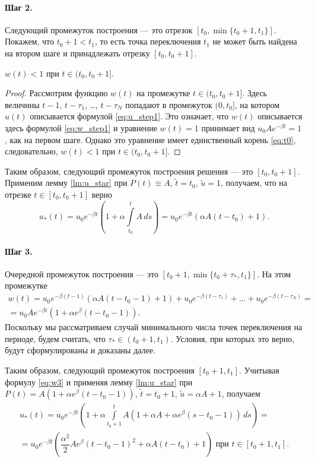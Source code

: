 \paragraph{Шаг 2.} Следующий промежуток построения --- это отрезок  $[t_0, \min\{t_0 + 1, t_1\}]$.
Покажем, что $t_0+1 < t_1$, то есть точка переключения $t_1$ не может быть найдена на втором шаге и принадлежать отрезку $[t_0, t_0 + 1]$.
\begin{lemma}
	\label{lm:u_step2}
	$w(t)<1$ при $t \in (t_0, t_0 + 1]$.
\end{lemma}
\begin{proof}
	Рассмотрим функцию $w(t)$ на промежутке $t \in (t_0,t_0+1]$. Здесь величины $t - 1$, $t - \tau_1$, \dots, $t - \tau_N$ попадают в промежуток $(0, t_0]$, на котором $u(t)$ описывается формулой \eqref{eq:u_step1}. Это означает, что $w(t)$ описывается здесь формулой \eqref{eq:w_step1} и уравнение $w(t) = 1$ принимает вид $u_0 A e^{-\beta t} = 1$, как на первом шаге. Однако это  уравнение имеет единственный корень \eqref{eq:t0}, следовательно, $w(t) < 1$ при $t \in (t_0, t_0 + 1]$.
\end{proof}

Таким образом, следующий промежуток построения решения --- это $[t_0,t_0+1]$. Применим лемму \eqref{lm:u_star} при $P(t)\equiv A$, $\tilde{t} = t_0$, $\tilde{u} = 1$, получаем, что на отрезке $t \in [t_0, t_0 + 1]$ верно
\begin{equation}
	\label{eq:u_step2}
	u_*(t)= u_0 e^{-\beta t}\left(1 + \alpha\int\limits_{t_0}^t A\,ds \right) = u_0 e^{-\beta t}(\alpha A(t-t_0) + 1).
\end{equation}

\paragraph{Шаг 3.} Очередной промежуток построения --- это $[t_0 + 1, \min\{t_0 + \tau_*, t_1\}]$. На этом промежутке
%
\begin{multline}
	\label{eq:w3}
	w(t)=u_0 e^{-\beta (t-1)}(\alpha A(t-t_0-1)+1)+u_0 e^{-\beta(t - \tau_1)} + \ldots + u_0 e^{-\beta(t-\tau_N)} = \\
	= u_0 A e^{-\beta t}(1 + \alpha e^{\beta}(t - t_0 - 1)).
\end{multline}
Поскольку мы рассматриваем случай минимального числа точек переключения на периоде, будем считать, что $\tau_* \in (t_0 + 1, t_1)$. Условия, при которых это верно, будут сформулированы и доказаны далее.

Таким образом, следующий промежуток построения $[t_0 + 1, t_1]$. Учитывая формулу \eqref{eq:w3} и применяя лемму \ref{lm:u_star} при $P(t) = A(1 + \alpha e^\beta(t - t_0 - 1))$, $\tilde{t} = t_0+1$, $\tilde{u}=\alpha A+1$, получаем
\begin{multline}
	\label{eq:u_step3}
	u_*(t) = u_0 e^{-\beta t}\left(1 + \alpha\int\limits_{t_0 + 1}^t A(1 + \alpha A + \alpha e^\beta(s - t_0 - 1)) \,ds \right) =\\= u_0 e^{-\beta t}\left(\dfrac{\alpha^2}{2}Ae^{\beta}(t-t_0-1)^2+\alpha A(t-t_0)+1\right)\text{ при }t\in[t_0+1,t_1].
\end{multline}

